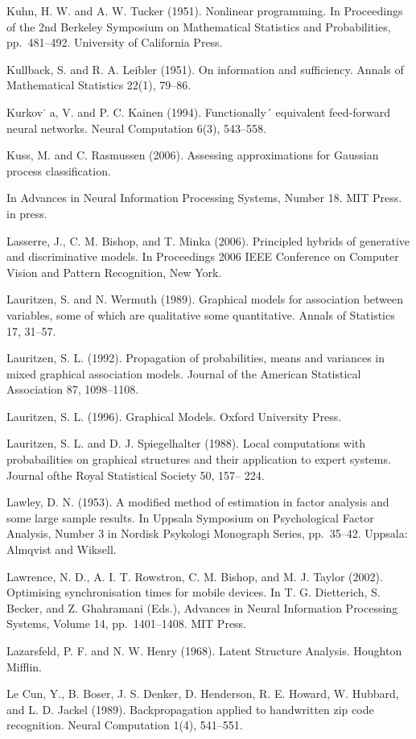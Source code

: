 \documentclass[
  10
]{article}
\begin{document}
Kuhn, H. W. and A. W. Tucker (1951). Nonlinear programming. In
Proceedings of the 2nd Berkeley Symposium on Mathematical Statistics and
Probabilities, pp.~481--492. University of California Press.

Kullback, S. and R. A. Leibler (1951). On information and sufficiency.
Annals of Mathematical Statistics 22(1), 79--86.

Kurkov˙ a, V. and P. C. Kainen (1994). Functionally´ equivalent
feed-forward neural networks. Neural Computation 6(3), 543--558.

Kuss, M. and C. Rasmussen (2006). Assessing approximations for Gaussian
process classification.

In Advances in Neural Information Processing Systems, Number 18. MIT
Press. in press.

Lasserre, J., C. M. Bishop, and T. Minka (2006). Principled hybrids of
generative and discriminative models. In Proceedings 2006 IEEE
Conference on Computer Vision and Pattern Recognition, New York.

Lauritzen, S. and N. Wermuth (1989). Graphical models for association
between variables, some of which are qualitative some quantitative.
Annals of Statistics 17, 31--57.

Lauritzen, S. L. (1992). Propagation of probabilities, means and
variances in mixed graphical association models. Journal of the American
Statistical Association 87, 1098--1108.

Lauritzen, S. L. (1996). Graphical Models. Oxford University Press.

Lauritzen, S. L. and D. J. Spiegelhalter (1988). Local computations with
probabailities on graphical structures and their application to expert
systems. Journal ofthe Royal Statistical Society 50, 157-- 224.

Lawley, D. N. (1953). A modified method of estimation in factor analysis
and some large sample results. In Uppsala Symposium on Psychological
Factor Analysis, Number 3 in Nordisk Psykologi Monograph Series,
pp.~35--42. Uppsala: Almqvist and Wiksell.

Lawrence, N. D., A. I. T. Rowstron, C. M. Bishop, and M. J. Taylor
(2002). Optimising synchronisation times for mobile devices. In T. G.
Dietterich, S. Becker, and Z. Ghahramani (Eds.), Advances in Neural
Information Processing Systems, Volume 14, pp.~1401--1408. MIT Press.

Lazarsfeld, P. F. and N. W. Henry (1968). Latent Structure Analysis.
Houghton Mifflin.

Le Cun, Y., B. Boser, J. S. Denker, D. Henderson, R. E. Howard, W.
Hubbard, and L. D. Jackel (1989). Backpropagation applied to handwritten
zip code recognition. Neural Computation 1(4), 541--551.
\end{document}
